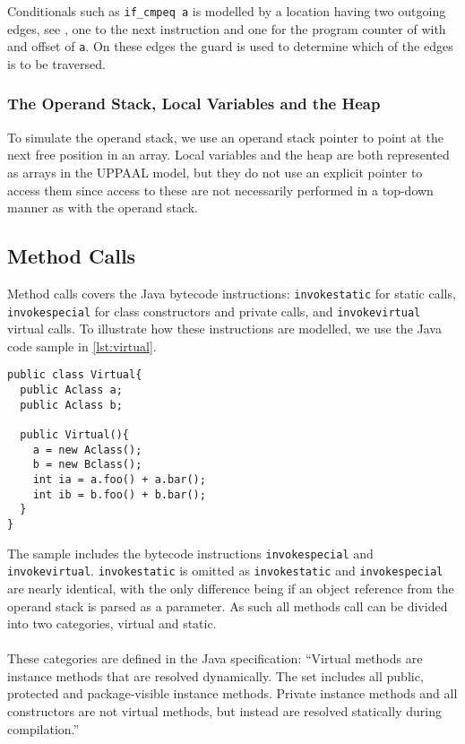 Conditionals such as \texttt{if\_cmpeq a} is modelled by a location having two outgoing edges, see , one to the next instruction and one for the program counter of with and offset of \texttt{a}. On these edges the guard is used to determine which of the edges is to be traversed.

\subsubsection{The Operand Stack, Local Variables and the Heap}
To simulate the operand stack, we use an operand stack pointer to point at the next free position in an array. Local variables and the heap are both represented as arrays in the UPPAAL model, but they do not use an explicit pointer to access them since access to these are not necessarily performed in a top-down manner as with the operand stack.

\subsection{Method Calls}\label{subsubsec:method}
Method calls covers the Java bytecode instructions: \texttt{invokestatic} for static calls, \texttt{invokespecial} for class constructors and private calls, and \texttt{invokevirtual} virtual calls. To illustrate how these instructions are modelled, we use the Java code sample in \cref{lst:virtual}.
\begin{lstlisting}[caption={\texttt{Bclass} extends \texttt{Aclass}, \texttt{Aclass} implements the methods foo and bar, and \texttt{Bclass} overwrites foo.}, label={lst:virtual}]
public class Virtual{
  public Aclass a;
  public Aclass b;

  public Virtual(){
    a = new Aclass();
    b = new Bclass();
    int ia = a.foo() + a.bar();
    int ib = b.foo() + b.bar();
  }
}
\end{lstlisting}
The sample includes the bytecode instructions \texttt{invokespecial} and \texttt{invokevirtual}.
\texttt{invokestatic} is omitted as \texttt{invokestatic} and \texttt{invokespecial} are nearly identical, with the only difference being if an object reference from the operand stack is parsed as a parameter.
As such all methods call can be divided into two categories, virtual and static.\\\\
These categories are defined in the Java specification: ``Virtual methods are instance methods that are resolved dynamically. The set includes all public, protected and package-visible instance methods. Private instance methods and all constructors are not virtual methods, but instead are resolved statically during compilation.''~\cite[chap. 4.3.7.6]{java_card_spec}

